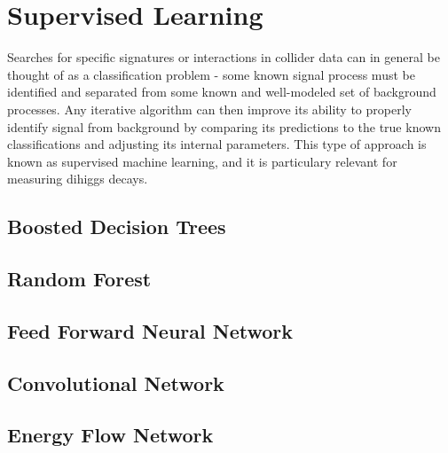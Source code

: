 \section{Supervised Learning}
\label{sec:supervised}
Searches for specific signatures or interactions in collider data can in general be thought of as a classification problem - some known signal process must be identified and separated from some known and well-modeled set of background processes. Any iterative algorithm can then improve its ability to properly identify signal from background by comparing its predictions to the true known classifications and adjusting its internal parameters. This type of approach is known as supervised machine learning, and it is particulary relevant for measuring dihiggs decays. 

\subsection{Boosted Decision Trees}


\subsection{Random Forest}


\subsection{Feed Forward Neural Network}


\subsection{Convolutional Network}



%

\subsection{Energy Flow Network}

